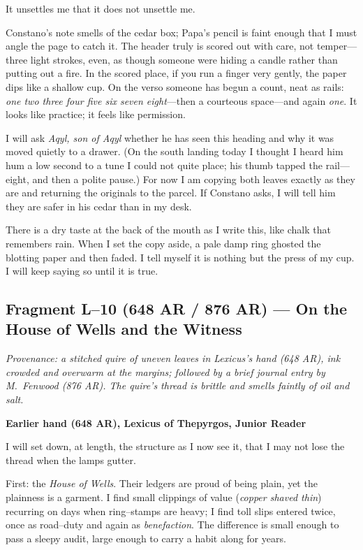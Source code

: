 \documentclass[11pt]{article}
\numberwithin{equation}{section} %
\theoremstyle{plain} %
\theoremstyle{definition} %
\theoremstyle{remark} %
\begin{document}
It unsettles me that it does not unsettle me.

Constano’s note smells of the cedar box; Papa’s pencil is faint enough that I must angle the page to catch it. The header truly is scored out with care, not temper—three light strokes, even, as though someone were hiding a candle rather than putting out a fire. In the scored place, if you run a finger very gently, the paper dips like a shallow cup. On the verso someone has begun a count, neat as rails: \emph{one two three four five six seven eight}—then a courteous space—and again \emph{one}. It looks like practice; it feels like permission.

I will ask \textit{Aqyl, son of Aqyl} whether he has seen this heading and why it was moved quietly to a drawer. (On the south landing today I thought I heard him hum a low second to a tune I could not quite place; his thumb tapped the rail—eight, and then a polite pause.) For now I am copying both leaves exactly as they are and returning the originals to the parcel. If Constano asks, I will tell him they are safer in his cedar than in my desk.

There is a dry taste at the back of the mouth as I write this, like chalk that remembers rain. When I set the copy aside, a pale damp ring ghosted the blotting paper and then faded. I tell myself it is nothing but the press of my cup. I will keep saying so until it is true.

\subsection{Fragment L--10 (648 AR / 876 AR) — On the House of Wells and the Witness}
\label{frag:l10}

\noindent\textit{Provenance: a stitched quire of uneven leaves in Lexicus’s hand (648 AR), ink crowded and overwarm at the margins; followed by a brief journal entry by M.\ Fenwood (876 AR). The quire’s thread is brittle and smells faintly of oil and salt.}

\medskip
\noindent\textbf{Earlier hand (648 AR), Lexicus of Thepyrgos, Junior Reader}

I will set down, at length, the structure as I now see it, that I may not lose the thread when the lamps gutter.

First: the \textit{House of Wells}. Their ledgers are proud of being plain, yet the plainness is a garment. I find small clippings of value (\emph{copper shaved thin}) recurring on days when ring–stamps are heavy; I find toll slips entered twice, once as road–duty and again as \emph{benefaction}. The difference is small enough to pass a sleepy audit, large enough to carry a habit along for years.
\end{document}
